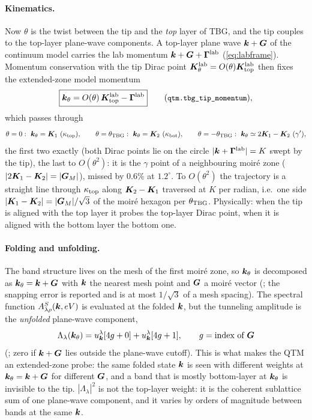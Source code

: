 \paragraph{Kinematics.} Now $\theta$ is the twist between the tip and the \emph{top} layer of TBG, and the tip couples
to the top-layer plane-wave components. A top-layer plane wave $\bm k+\bm G$ of the continuum model carries the lab momentum
$\bm k+\bm G+\bm\Gamma^{\rm lab}$ (\cref{eq:labframe}). Momentum conservation with the tip Dirac point
$\bm K^{\rm lab}_\theta=O(\theta)\bm K^{\rm lab}_{\rm top}$ then fixes the extended-zone model momentum
\begin{equation}
\boxed{\bk_\theta=O(\theta)\,\bK^{\rm lab}_{\rm top}-\bm\Gamma^{\rm lab}}\qquad(\code{qtm.tbg\_tip\_momentum}),
\label{eq:ktheta}
\end{equation}
which passes through
\begin{equation}
\theta=0:\ \bk_\theta=\bK_1\ (\kappa_{\rm top}),\qquad
\theta=\theta_{\rm TBG}:\ \bk_\theta=\bK_2\ (\kappa_{\rm bot}),\qquad
\theta=-\theta_{\rm TBG}:\ \bk_\theta\simeq2\bK_1-\bK_2\ (\gamma'),
\end{equation}
the first two exactly (both Dirac points lie on the circle $|\bm k+\bm\Gamma^{\rm lab}|=K$ swept by the tip), the last to
$O(\theta^2)$: it is the $\gamma$ point of a neighbouring moir\'e zone ($|2\bm K_1-\bm K_2|=|\bm G_M|$), missed by $0.6\%$ at
$1.2^\circ$. To $O(\theta^2)$ the trajectory is a straight line through $\kappa_{\rm top}$ along $\bm K_2-\bm K_1$ traversed at $K$ per radian, i.e.\ one
side $|\bm K_1-\bm K_2|=|\bm G_M|/\sqrt3$ of the moir\'e hexagon per $\theta_{\rm TBG}$. Physically: when the tip is
aligned with the top layer it probes the top-layer Dirac point, when it is aligned with the bottom layer the
bottom one.

\paragraph{Folding and unfolding.} The band structure lives on the mesh of the first moir\'e zone, so
$\bm k_\theta$ is decomposed as $\bm k_\theta=\bm k+\bm G$ with $\bm k$ the nearest mesh point and $\bm G$ a moir\'e vector
(; the snapping error is reported and is at most $1/\sqrt3$ of a mesh spacing).
The spectral function $A^S_{\lambda\rho}(\bm k,eV)$ is evaluated at the folded $\bm k$, but the tunneling amplitude
is the \emph{unfolded} plane-wave component,
\begin{equation}
\Lambda_\lambda(\bm k_\theta)=u^\lambda_{\bm k}[4g+0]+u^\lambda_{\bm k}[4g+1],\qquad g=\text{index of }\bm G
\label{eq:Lambdatbg}
\end{equation}
(; zero if $\bm k+\bm G$ lies outside the plane-wave cutoff). This is what makes the
QTM an extended-zone probe: the same folded state $\bm k$ is seen with different weights at $\bm k_\theta=\bm k+\bm G$ for
different $\bm G$, and a band that is mostly bottom-layer at $\bm k_\theta$ is invisible to the tip. $|\Lambda_\lambda|^2$
is not the top-layer weight: it is the coherent sublattice sum of one plane-wave component, and it varies by
orders of magnitude between bands at the same $\bm k$.

